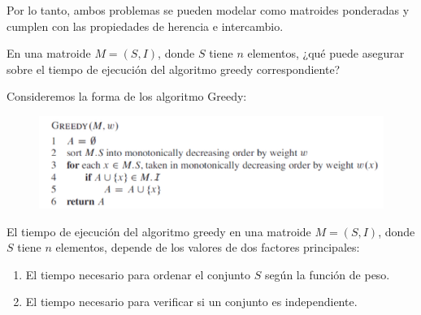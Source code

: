 \begin{problema}
\begin{dem}
\begin{itemize}
        \end{itemize}

        Por lo tanto, ambos problemas se pueden modelar como matroides ponderadas y cumplen con las propiedades de herencia e intercambio.


    \end{dem}

\end{problema}


\begin{problema}
    En una matroide $M=(S, I)$, donde $S$ tiene $n$ elementos, ¿qué puede asegurar sobre el tiempo de ejecución del algoritmo greedy correspondiente?
    \begin{sol}
        Consideremos la forma de los algoritmo Greedy: 
        \begin{figure}[H]
            \centering
            \includegraphics[scale=0.5]{Problemas/11.png}
        \end{figure}
        El tiempo de ejecución del algoritmo greedy en una matroide $M=(S, I)$, donde $S$ tiene $n$ elementos, depende de los valores de dos factores principales:
        \begin{enumerate}
            \item El tiempo necesario para ordenar el conjunto $S$ según la función de peso.
            \item El tiempo necesario para verificar si un conjunto es independiente.
        \end{enumerate}

    \end{sol}
\end{problema}


